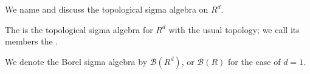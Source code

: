 
\sbasic



\sstart



We name and discuss
the topological sigma algebra on
$R^d$.


The 
is the topological sigma algebra
for $R^d$ with the usual topology;
we call its members the
.


We denote the Borel sigma algebra
by $\mathcal{B}(R^d)$, or
$\mathcal{B}(R)$ for the case of $d = 1$.

\strats
